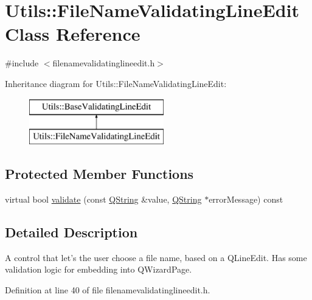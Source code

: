 \hypertarget{class_utils_1_1_file_name_validating_line_edit}{\section{\-Utils\-:\-:\-File\-Name\-Validating\-Line\-Edit \-Class \-Reference}
\label{class_utils_1_1_file_name_validating_line_edit}
}


{\ttfamily \#include $<$filenamevalidatinglineedit.\-h$>$}

\-Inheritance diagram for \-Utils\-:\-:\-File\-Name\-Validating\-Line\-Edit\-:\begin{figure}[H]
\begin{center}
\leavevmode
\includegraphics[height=2.000000cm]{class_utils_1_1_file_name_validating_line_edit}
\end{center}
\end{figure}
\subsection*{\-Protected \-Member \-Functions}
\begin{DoxyCompactItemize}
\item 
virtual bool \hyperlink{class_utils_1_1_file_name_validating_line_edit_a6ba8ad815a56a23c6ffde57188e4c73a}{validate} (const \hyperlink{group___u_a_v_objects_plugin_gab9d252f49c333c94a72f97ce3105a32d}{\-Q\-String} \&value, \hyperlink{group___u_a_v_objects_plugin_gab9d252f49c333c94a72f97ce3105a32d}{\-Q\-String} $\ast$error\-Message) const 
\end{DoxyCompactItemize}


\subsection{\-Detailed \-Description}
\-A control that let's the user choose a file name, based on a \-Q\-Line\-Edit. \-Has some validation logic for embedding into \-Q\-Wizard\-Page. 

\-Definition at line 40 of file filenamevalidatinglineedit.\-h.



